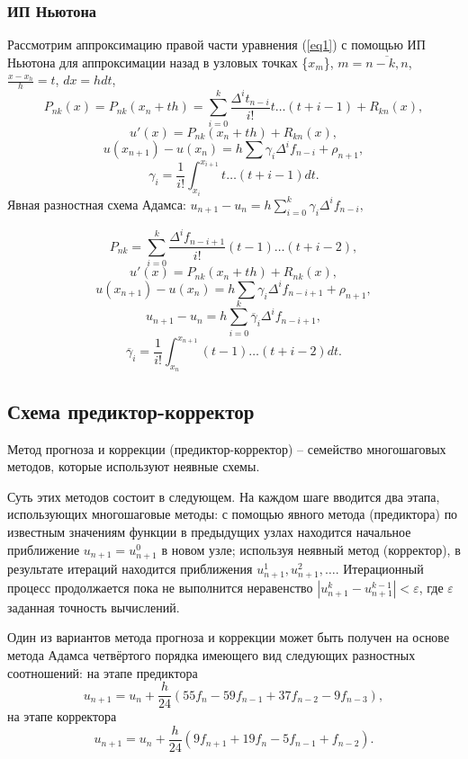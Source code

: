 \documentclass[
11pt,
master, %
subf, %
href, %
colorlinks=true, %
times, %
]{disser}
\begin{document}
\subsubsection{ИП Ньютона}
Рассмотрим аппроксимацию правой части уравнения (\ref{eq1}) с помощью ИП Ньютона для аппроксимации назад в узловых точках \{$x_m$\}, $m = \overline{n-k, n}$, $\frac{x - x_h}{h} = t$, $dx = hdt$,
$$P_{nk}(x) = P_{nk}(x_n + th) = \sum_{i=0}^{k} \frac{\Delta^i t_{n-i}}{i!}t\ldots (t+i-1) + R_{kn}(x),$$
$$u'(x) = P_{nk}(x_n + th) + R_{kn}(x),$$
\begin{equation}
  u(x_{n+1}) - u(x_n) = h\sum \gamma_i \Delta^i f_{n-i} + \rho_{n+1},
\end{equation}
$$\gamma_i = \frac{1}{i!}\int_{x_i}^{x_{i+1}} t\ldots (t+i-1)dt.$$
Явная разностная схема Адамса: $u_{n+1} - u_n = h\sum_{i=0}^{k} \gamma_i \Delta^i f_{n-i},$

$$P_{nk} = \sum_{i=0}^{k}\frac{\Delta^i f_{n-i+1}}{i!}(t-1)\ldots (t+i-2),$$
$$u'(x) = P_{nk}(x_n + th) + R_{nk}(x),$$
\begin{equation}
  u(x_{n+1}) - u(x_n) = h\sum \gamma_i\Delta^i f_{n-i+1} + \rho_{n+1},
\end{equation}
$$u_{n+1} - u_n = h \sum_{i=0}^{k} \overline{\gamma}_i \Delta^i f_{n-i+1},$$
$$\overline{\gamma}_i = \frac{1}{i!} \int_{x_n}^{x_{n+1}}(t-1)\ldots (t+i-2)dt.$$

\subsection{Схема предиктор-корректор}
Метод прогноза и коррекции (предиктор-корректор) -- семейство многошаговых методов, которые используют неявные схемы.

Суть этих методов состоит в следующем. На каждом шаге вводится два этапа, использующих многошаговые методы: с помощью явного метода (предиктора) по известным значениям функции в предыдущих узлах находится начальное приближение $u_{n+1} = u_{n+1}^0$ в новом узле; используя неявный метод (корректор), в результате итераций находится приближения $u_{n+1}^1, u_{n+1}^2,\ldots$. Итерационный процесс продолжается пока не выполнится неравенство $|u_{n+1}^k - u_{n+1}^{k-1}| < \varepsilon$, где $\varepsilon$ заданная точность вычислений.

Один из вариантов метода прогноза и коррекции может быть получен на основе метода Адамса четвёртого порядка имеющего вид следующих разностных соотношений: на этапе предиктора
\begin{equation}\label{eq14}
  u_{n+1} = u_n + \frac{h}{24}(55f_n - 59f_{n-1} + 37f_{n-2} - 9f_{n-3}),
\end{equation}
на этапе корректора
\begin{equation}\label{eq15}
  u_{n+1} = u_n + \frac{h}{24}(9f_{n+1} + 19f_n - 5f_{n-1} + f_{n-2}).
\end{equation}
\end{document}
